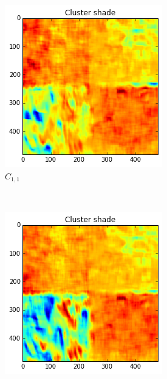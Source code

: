 \documentclass[a4paper]{article}
\begin{document}
\begin{figure}
    \centering
    \begin{subfigure}[b]{0.30\textwidth}
        \centering
        \includegraphics[width=\textwidth]{cls11.png}
        \caption{%
            $C_{1,1}$
        }
        \label{fig:c11}
    \end{subfigure}
    ~
    \begin{subfigure}[b]{0.30\textwidth}
        \centering
        \includegraphics[width=\textwidth]{cls21.png}

\end{subfigure}
\end{figure}
\end{document}
